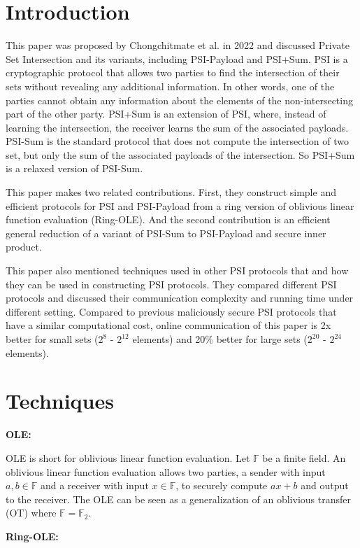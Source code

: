 \documentclass{source/Paper}
\date{\today}
\begin{document}
    \makeheader
    \section{Introduction}
    This paper\cite{chongchitmate2022psi} was proposed by Chongchitmate et al. in 2022 and discussed Private Set Intersection and its variants, including PSI-Payload and PSI+Sum. PSI is a cryptographic protocol that allows two parties to find the intersection of their sets without revealing any additional information. In other words, one of the parties cannot obtain any information about the elements of the non-intersecting part of the other party. PSI+Sum is an extension of PSI, where, instead of learning the intersection, the receiver learns the sum of the associated payloads. PSI-Sum is the standard protocol that does not compute the intersection of two set, but only the sum of the associated payloads of the intersection. So PSI+Sum is a relaxed version of PSI-Sum.

    This paper makes two related contributions. First, they construct simple and efficient protocols for PSI and PSI-Payload from a ring version of oblivious linear function evaluation (Ring-OLE). And the second contribution is an efficient general reduction of a variant of PSI-Sum to PSI-Payload and secure inner product.

    This paper also mentioned techniques used in other PSI protocols that and how they can be used in constructing PSI protocols. They compared different PSI protocols and discussed their communication complexity and running time under different setting. Compared to previous maliciously secure PSI protocols that have a similar computational cost, online communication of this paper is 2x better for small sets ($2^8$ - $2^{12}$ elements) and 20\% better for large sets ($2^{20}$ - $2^{24}$ elements).
    \section{Techniques}
    \textbf{OLE:} 

    OLE is short for oblivious linear function evaluation.
    Let $\mathbb{F}$  be a finite field. An oblivious linear function evaluation allows two parties, a sender with input $a,b \in \mathbb{F} $ and a receiver with input $x \in \mathbb{F} $, to securely compute $ax + b$ and output to the receiver.
    The OLE can be seen as a generalization of an oblivious transfer
    (OT) where $\mathbb{F} = \mathbb{F}_2 $.

    \textbf{Ring-OLE:}
\end{document}
